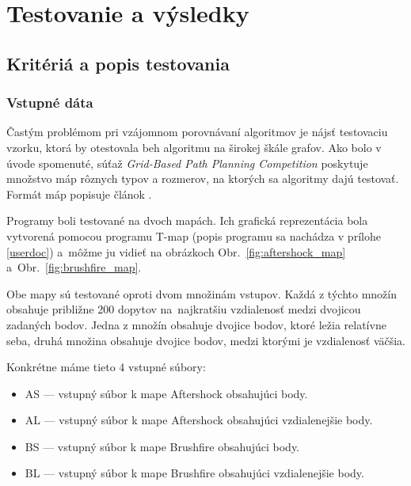\chapter{Testovanie a výsledky}

\section{Kritériá a popis testovania}
\subsection{Vstupné dáta}
Častým problémom pri vzájomnom porovnávaní algoritmov je
nájsť testovaciu vzorku, ktorá by otestovala beh algoritmu na širokej škále grafov.
Ako bolo v úvode spomenuté, súťaž {\sl Grid-Based Path Planning Competition} poskytuje množstvo máp rôznych typov a rozmerov,
na ktorých sa algoritmy dajú testovať. Formát máp popisuje článok \cite{sturtevant2012benchmarks}.

Programy boli testované na dvoch mapách. Ich grafická reprezentácia bola 
vytvorená pomocou programu T-map (popis programu sa nachádza v prílohe \ref{userdoc}) 
a~môžme ju vidieť na obrázkoch Obr.~\ref{fig:aftershock_map} a~Obr.~\ref{fig:brushfire_map}.

Obe mapy sú testované oproti dvom množinám vstupov.
Každá z týchto množín obsahuje približne 200 dopytov
 na~najkratšiu vzdialenosť medzi dvojicou zadaných bodov.
Jedna z množín obsahuje dvojice bodov, ktoré ležia relatívne  seba, druhá množina obsahuje dvojice bodov, medzi ktorými je vzdialenosť väčšia.


Konkrétne máme tieto 4 vstupné súbory:
\begin{itemize}
\item AS --- vstupný súbor k mape Aftershock obsahujúci  body.
\item AL --- vstupný súbor k mape Aftershock obsahujúci vzdialenejšie body.
\item BS --- vstupný súbor k mape Brushfire obsahujúci  body.
\item BL --- vstupný súbor k mape Brushfire obsahujúci vzdialenejšie body.
\end{itemize}


